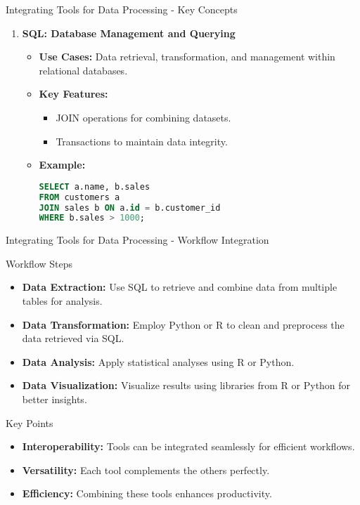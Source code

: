 \documentclass[aspectratio=169]{beamer}
\begin{document}
\begin{frame}[fragile]{Integrating Tools for Data Processing - Key Concepts}
\begin{enumerate}
    \item \textbf{SQL: Database Management and Querying}
      \begin{itemize}
        \item \textbf{Use Cases:} Data retrieval, transformation, and management within relational databases.
        \item \textbf{Key Features:}
          \begin{itemize}
            \item JOIN operations for combining datasets.
            \item Transactions to maintain data integrity.
          \end{itemize}
        \item \textbf{Example:}
        \begin{lstlisting}[language=SQL]
SELECT a.name, b.sales 
FROM customers a 
JOIN sales b ON a.id = b.customer_id
WHERE b.sales > 1000;
        \end{lstlisting}
      \end{itemize}
  \end{enumerate}
\end{frame}

\begin{frame}[fragile]{Integrating Tools for Data Processing - Workflow Integration}
  \begin{block}{Workflow Steps}
    \begin{itemize}
      \item \textbf{Data Extraction:} Use SQL to retrieve and combine data from multiple tables for analysis.
      \item \textbf{Data Transformation:} Employ Python or R to clean and preprocess the data retrieved via SQL.
      \item \textbf{Data Analysis:} Apply statistical analyses using R or Python.
      \item \textbf{Data Visualization:} Visualize results using libraries from R or Python for better insights.
    \end{itemize}
  \end{block}
  
  \begin{block}{Key Points}
    \begin{itemize}
      \item \textbf{Interoperability:} Tools can be integrated seamlessly for efficient workflows.
      \item \textbf{Versatility:} Each tool complements the others perfectly.
      \item \textbf{Efficiency:} Combining these tools enhances productivity.
    \end{itemize}
  \end{block}
\end{frame}
\end{document}
